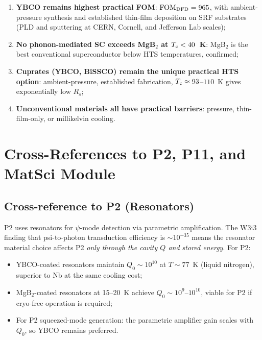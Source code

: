 \documentclass[11pt]{article}
\newcommand{\Tc}{T_{\rm c}}
\newcommand{\FOM}{\mathrm{FOM}}
\begin{document}
\begin{enumerate}
\item \textbf{YBCO remains highest practical FOM}: $\FOM_{\rm DFD} = 965$, with
  ambient-pressure synthesis and established thin-film deposition on SRF
  substrates (PLD and sputtering at CERN, Cornell, and Jefferson Lab scales);

\item \textbf{No phonon-mediated SC exceeds MgB$_2$ at $\Tc < 40$~K}: MgB$_2$
  is the best conventional superconductor below HTS temperatures, confirmed;

\item \textbf{Cuprates (YBCO, BiSSCO) remain the unique practical HTS option}:
  ambient-pressure, established fabrication, $\Tc \approx 93$--$110$~K gives
  exponentially low $R_s$;

\item \textbf{Unconventional materials all have practical barriers}: pressure,
  thin-film-only, or millikelvin cooling.
\end{enumerate}

\section{Cross-References to P2, P11, and MatSci Module}
\label{sec:xref}

\subsection{Cross-reference to P2 (Resonators)}

P2 uses resonators for $\psi$-mode detection via parametric amplification.
The W3i3 finding that psi-to-photon transduction efficiency is $\sim 10^{-35}$
means the resonator material choice affects P2 \emph{only through the
cavity $Q$ and stored energy}. For P2:

\begin{itemize}
\item YBCO-coated resonators maintain $Q_0 \sim 10^{10}$ at $T \sim 77$~K
  (liquid nitrogen), superior to Nb at the same cooling cost;
\item MgB$_2$-coated resonators at 15--20~K achieve $Q_0 \sim 10^9$--$10^{10}$,
  viable for P2 if cryo-free operation is required;
\item For P2 squeezed-mode generation: the parametric amplifier gain scales
  with $Q_0$, so YBCO remains preferred.
\end{itemize}
\end{document}
